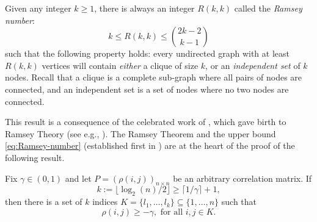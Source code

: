 


Given any integer $k\ge 1$, there is always an integer $R(k,k)$ called the {\em Ramsey number}:
\begin{equation}\label{eq:Ramsey-number}
k\le R(k,k)\le \binom{2k-2}{k-1}
\end{equation}
such that the following property holds:
every undirected graph with at least $R(k,k)$ vertices will contain {\em either} a clique of size $k$, or an {\em independent set} of $k$ nodes. 
Recall that a clique is a complete sub-graph where all pairs of nodes are connected, and an independent set is a set of nodes where no two nodes are connected.

This result is a consequence of the celebrated work of \citet{ramsey2009problem}, which 
gave birth to Ramsey Theory (see e.g., \citet{conlon2015recent}).  
The Ramsey Theorem and the upper bound \eqref{eq:Ramsey-number} (established first in \cite{erdos1935combinatorial}) are at the heart of the proof of the following result.

\begin{proposition} \label{prop:lower-bound-correlation-Ramsey}
  Fix $\gamma\in(0,1)$ and let $P = \left(\rho(i,j)\right)_{n\times n}$ be an arbitrary correlation
  matrix. If 
  \begin{equation}\label{eq:Ramsey-the-k-def}
   k:= \lfloor \log_2({n})/2 \rfloor  \ge \lceil 1/\gamma \rceil + 1,
  \end{equation}
  then there is a set of $k$ indices $K = \{l_1, \ldots, l_k\}\subseteq \{1,\ldots,n\}$ 
  such that 
  \begin{equation} \label{eq:lower-bound-correlation-Ramsey}
      \rho(i,j) \ge -\gamma, \mbox{ for all } i,j\in K.
  \end{equation}
\end{proposition}

